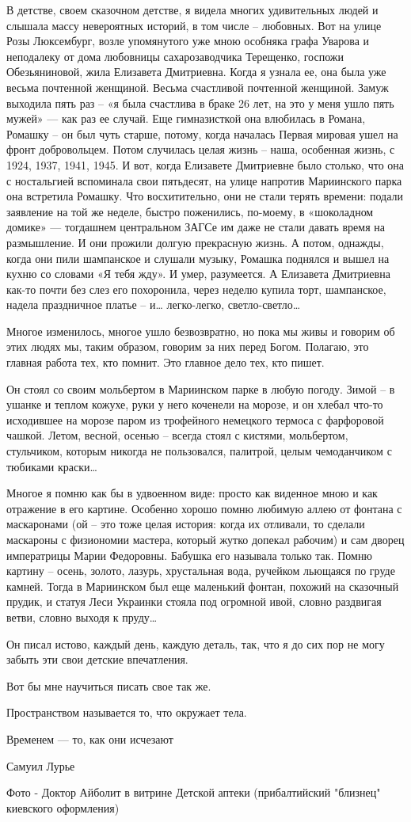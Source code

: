В детстве, своем сказочном детстве, я видела многих удивительных людей и
слышала массу невероятных историй, в том числе – любовных. Вот на улице Розы
Люксембург, возле упомянутого уже мною особняка графа Уварова и неподалеку от
дома любовницы сахарозаводчика Терещенко, госпожи Обезьяниновой, жила Елизавета
Дмитриевна. Когда я узнала ее, она была уже весьма почтенной женщиной. Весьма
счастливой почтенной женщиной. Замуж выходила пять раз – «я была счастлива в
браке 26 лет, на это у меня ушло пять мужей» — как раз ее случай. Еще
гимназисткой она влюбилась в Романа, Ромашку – он был чуть старше, потому,
когда началась Первая мировая ушел на фронт добровольцем. Потом случилась целая
жизнь – наша, особенная жизнь, с 1924, 1937, 1941, 1945. И вот, когда Елизавете
Дмитриевне было столько, что она с ностальгией вспоминала свои пятьдесят, на
улице напротив Мариинского парка она встретила Ромашку. Что восхитительно, они
не стали терять времени: подали заявление на той же неделе, быстро поженились,
по-моему, в «шоколадном домике» — тогдашнем центральном ЗАГСе им даже не стали
давать время на размышление. И они прожили долгую прекрасную жизнь. А потом,
однажды, когда они пили шампанское и слушали музыку, Ромашка поднялся и вышел
на кухню со словами «Я тебя жду». И умер, разумеется. А Елизавета Дмитриевна
как-то почти без слез его похоронила, через неделю купила торт, шампанское,
надела праздничное платье – и… легко-легко, светло-светло…

Многое изменилось, многое ушло безвозвратно, но пока мы живы и говорим об этих
людях мы, таким образом, говорим за них перед Богом. Полагаю, это главная
работа тех, кто помнит. Это главное дело тех, кто пишет.

Он стоял со своим мольбертом в Мариинском парке в любую погоду. Зимой – в
ушанке и теплом кожухе, руки у него коченели на морозе, и он хлебал что-то
исходившее на морозе паром из трофейного немецкого термоса с фарфоровой чашкой.
Летом, весной, осенью – всегда стоял с кистями, мольбертом, стульчиком, которым
никогда не пользовался, палитрой, целым чемоданчиком с тюбиками краски…

Многое я помню как бы в удвоенном виде: просто как виденное мною и как
отражение в его картине. Особенно хорошо помню любимую аллею от фонтана с
маскаронами (ой – это тоже целая история: когда их отливали, то сделали
маскароны с физиономии мастера, который жутко допекал рабочим) и сам дворец
императрицы Марии Федоровны. Бабушка его называла только так. Помню картину –
осень, золото, лазурь, хрустальная вода, ручейком льющаяся по груде камней.
Тогда в Мариинском был еще маленький фонтан, похожий на сказочный прудик, и
статуя Леси Украинки стояла под огромной ивой, словно раздвигая ветви, словно
выходя к пруду…

Он писал истово, каждый день, каждую деталь, так, что я до сих пор не могу
забыть эти свои детские впечатления.

Вот бы мне научиться писать свое так же.

Пространством называется то, что окружает тела.

Временем — то, как они исчезают

Самуил Лурье

Фото - Доктор Айболит в витрине Детской аптеки (прибалтийский "близнец"
киевского оформления)
